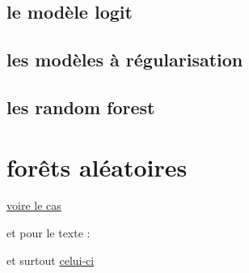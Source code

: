 \documentclass[
]{book}
\begin{document}
\hypertarget{le-moduxe8le-logit}{%
\subsection{le modèle logit}\label{le-moduxe8le-logit}}

\hypertarget{les-moduxe8les-uxe0-ruxe9gularisation}{%
\subsection{les modèles à régularisation}\label{les-moduxe8les-uxe0-ruxe9gularisation}}

\hypertarget{les-random-forest}{%
\subsection{les random forest}\label{les-random-forest}}

\hypertarget{foruxeats-aluxe9atoires-1}{%
\section{forêts aléatoires}\label{foruxeats-aluxe9atoires-1}}

\href{http://r.benavent.fr/MM.html}{voire le cas}

et pour le texte :

et surtout \href{https://benaventc.github.io/NLPBook/machine-learning-supervis\%C3\%A9-et-nlp.html}{celui-ci}

  
\end{document}
